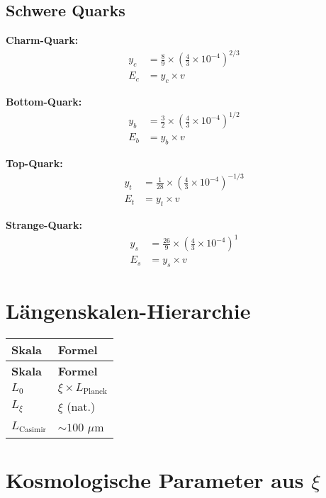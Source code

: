 \documentclass[12pt,a4paper]{article}
\begin{document}
	\subsection{Schwere Quarks}
	
	\textbf{Charm-Quark:}
	\begin{align}
		y_c &= \frac{8}{9} \times \left(\frac{4}{3} \times 10^{-4}\right)^{2/3} \\
		E_c &= y_c \times v
	\end{align}
	
	\textbf{Bottom-Quark:}
	\begin{align}
		y_b &= \frac{3}{2} \times \left(\frac{4}{3} \times 10^{-4}\right)^{1/2} \\
		E_b &= y_b \times v
	\end{align}
	
	\textbf{Top-Quark:}
	\begin{align}
		y_t &= \frac{1}{28} \times \left(\frac{4}{3} \times 10^{-4}\right)^{-1/3} \\
		E_t &= y_t \times v
	\end{align}
	
	\textbf{Strange-Quark:}
	\begin{align}
		y_s &= \frac{26}{9} \times \left(\frac{4}{3} \times 10^{-4}\right)^{1} \\
		E_s &= y_s \times v
	\end{align}
	
	\section{Längenskalen-Hierarchie}
	
	\begin{longtable}{|p{3cm}|p{4cm}|}
		\hline
		\textbf{Skala} & \textbf{Formel} \\
		\hline
		\endfirsthead
		\hline
		\textbf{Skala} & \textbf{Formel} \\
		\hline
		\endhead
		\(L_0\) & \(\xi \times L_{\text{Planck}}\) \\
		\hline
		\(L_{\xi}\) & \(\xi\) (nat.) \\
		\hline
		\(L_{\text{Casimir}}\) & \(\sim 100\) \(\mu\)m \\
		\hline
	\end{longtable}
	
	\section{Kosmologische Parameter aus \(\xi\)}
	
\end{document}
